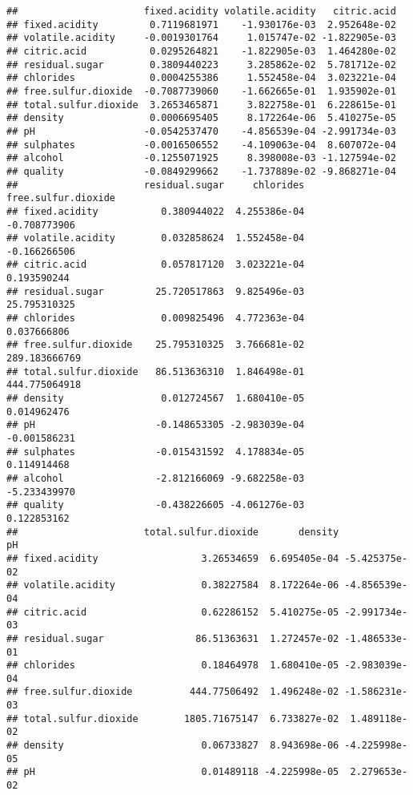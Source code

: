 \documentclass[
]{article}
\begin{document}
\begin{verbatim}
##                      fixed.acidity volatile.acidity   citric.acid
## fixed.acidity         0.7119681971    -1.930176e-03  2.952648e-02
## volatile.acidity     -0.0019301764     1.015747e-02 -1.822905e-03
## citric.acid           0.0295264821    -1.822905e-03  1.464280e-02
## residual.sugar        0.3809440223     3.285862e-02  5.781712e-02
## chlorides             0.0004255386     1.552458e-04  3.023221e-04
## free.sulfur.dioxide  -0.7087739060    -1.662665e-01  1.935902e-01
## total.sulfur.dioxide  3.2653465871     3.822758e-01  6.228615e-01
## density               0.0006695405     8.172264e-06  5.410275e-05
## pH                   -0.0542537470    -4.856539e-04 -2.991734e-03
## sulphates            -0.0016506552    -4.109063e-04  8.607072e-04
## alcohol              -0.1255071925     8.398008e-03 -1.127594e-02
## quality              -0.0849299662    -1.737889e-02 -9.868271e-04
##                      residual.sugar     chlorides free.sulfur.dioxide
## fixed.acidity           0.380944022  4.255386e-04        -0.708773906
## volatile.acidity        0.032858624  1.552458e-04        -0.166266506
## citric.acid             0.057817120  3.023221e-04         0.193590244
## residual.sugar         25.720517863  9.825496e-03        25.795310325
## chlorides               0.009825496  4.772363e-04         0.037666806
## free.sulfur.dioxide    25.795310325  3.766681e-02       289.183666769
## total.sulfur.dioxide   86.513636310  1.846498e-01       444.775064918
## density                 0.012724567  1.680410e-05         0.014962476
## pH                     -0.148653305 -2.983039e-04        -0.001586231
## sulphates              -0.015431592  4.178834e-05         0.114914468
## alcohol                -2.812166069 -9.682258e-03        -5.233439970
## quality                -0.438226605 -4.061276e-03         0.122853162
##                      total.sulfur.dioxide       density            pH
## fixed.acidity                  3.26534659  6.695405e-04 -5.425375e-02
## volatile.acidity               0.38227584  8.172264e-06 -4.856539e-04
## citric.acid                    0.62286152  5.410275e-05 -2.991734e-03
## residual.sugar                86.51363631  1.272457e-02 -1.486533e-01
## chlorides                      0.18464978  1.680410e-05 -2.983039e-04
## free.sulfur.dioxide          444.77506492  1.496248e-02 -1.586231e-03
## total.sulfur.dioxide        1805.71675147  6.733827e-02  1.489118e-02
## density                        0.06733827  8.943698e-06 -4.225998e-05
## pH                             0.01489118 -4.225998e-05  2.279653e-02

\end{verbatim}
\end{document}
